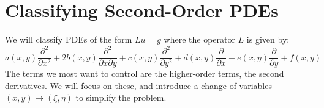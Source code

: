 \documentclass[../Main.tex]{subfiles}
\begin{document}
\section{Classifying Second-Order PDEs}
We will classify PDEs of the form $Lu = g$ where the operator $L$ is given by:
\begin{equation}
    a(x, y) \frac{\partial^{2}}{\partial x^{2}} + 2b(x, y) \frac{\partial^{2}}{\partial x\partial y} + c(x, y) \frac{\partial^{2}}{\partial y^{2}} + d(x, y) \frac{\partial }{\partial x} + e(x, y) \frac{\partial }{\partial y} + f(x, y)
    \label{eqnGeneralSOPDE}
\end{equation}
The terms we most want to control are the higher-order terms, the second derivatives. We will focus on these, and introduce a change of variables $(x, y) \mapsto (\xi, \eta)$ to simplify the problem.
\end{document}
